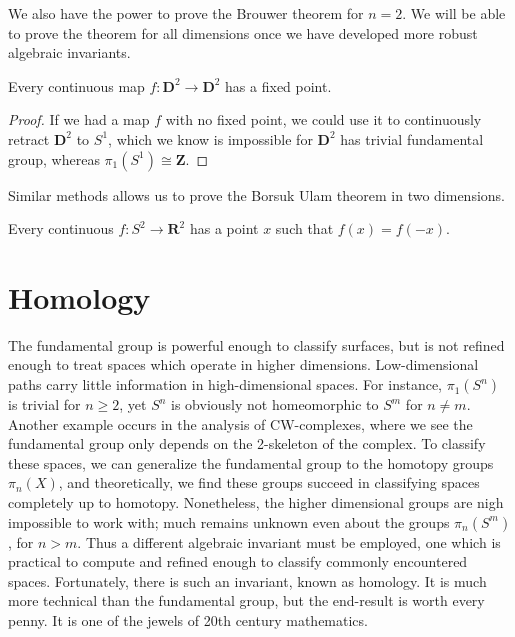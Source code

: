 We also have the power to prove the Brouwer theorem for $n = 2$. We will be able to prove the theorem for all dimensions once we have developed more robust algebraic invariants.

\begin{theorem}
    Every continuous map $f: \mathbf{D}^2 \to \mathbf{D}^2$ has a fixed point.
\end{theorem}
\begin{proof}
    If we had a map $f$ with no fixed point, we could use it to continuously retract $\mathbf{D}^2$ to $S^1$, which we know is impossible for $\mathbf{D}^2$ has trivial fundamental group, whereas $\pi_1(S^1) \cong \mathbf{Z}$.
\end{proof}

Similar methods allows us to prove the Borsuk Ulam theorem in two dimensions.

\begin{theorem}
    Every continuous $f: S^2 \to \mathbf{R}^2$ has a point $x$ such that $f(x) = f(-x)$.
\end{theorem}






\chapter{Homology}

The fundamental group is powerful enough to classify surfaces, but is not refined enough to treat spaces which operate in higher dimensions. Low-dimensional paths carry little information in high-dimensional spaces. For instance, $\pi_1(S^n)$ is trivial for $n \geq 2$, yet $S^n$ is obviously not homeomorphic to $S^m$ for $n \neq m$. Another example occurs in the analysis of CW-complexes, where we see the fundamental group only depends on the 2-skeleton of the complex. To classify these spaces, we can generalize the fundamental group to the homotopy groups $\pi_n(X)$, and theoretically, we find these groups succeed in classifying spaces completely up to homotopy. Nonetheless, the higher dimensional groups are nigh impossible to work with; much remains unknown even about the groups $\pi_n(S^m)$, for $n > m$. Thus a different algebraic invariant must be employed, one which is practical to compute and refined enough to classify commonly encountered spaces.  Fortunately, there is such an invariant, known as homology. It is much more technical than the fundamental group, but the end-result is worth every penny. It is one of the jewels of 20th century mathematics.

